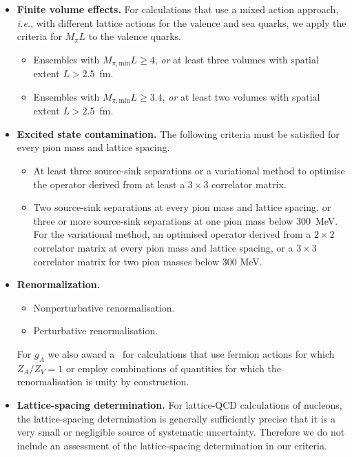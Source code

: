 \begin{itemize}
\item {\bfseries Finite volume effects.} 
%
For calculations that use a mixed action approach, {\it i.e.},
with different lattice actions for the valence and sea quarks, 
we apply the criteria for $M_\pi L$ to the valence quarks.
%
\begin{itemize}
%
\item[\bstar] Ensembles with $M_{\pi,\mathrm{min}}L\geq 4$, \emph{or} at least 
three volumes with spatial extent $L>2.5$~fm.
\item[\bcirc] Ensembles with $M_{\pi,\mathrm{min}}L \geq 3.4$, \emph{or} at least 
two volumes with spatial extent $L>2.5$~fm.
\end{itemize}

\item {\bfseries Excited state contamination.} 
The following criteria must be satisfied for every pion mass and lattice 
spacing.
%
\begin{itemize}
%
\item[\bstar] At least three source-sink separations or a variational method 
to optimise the operator derived from at least a $3\times 3$ correlator matrix.
% 
\item[\bcirc] Two source-sink separations at every pion mass and lattice 
spacing, or three or more source-sink separations at one pion mass below 
300~MeV. 
%
For the variational method, an optimised operator derived from a $2\times 2$ 
correlator matrix at every pion mass and lattice spacing, or a $3\times 3$ 
correlator matrix for two pion masses below 300 MeV.
%
\end{itemize}

\item {\bfseries Renormalization.} 
\begin{itemize}
%
\item[\bstar] Nonperturbative renormalisation.
%
\item[\bcirc] Perturbative renormalisation.
%
\end{itemize}
%
For $g_A$ we also award a \bstar~for calculations that use fermion actions 
for which $Z_A/Z_V=1$ or employ combinations of quantities for which the 
renormalisation is unity by construction.

\item {\bfseries Lattice-spacing determination.} 
For lattice-QCD calculations of nucleons, the lattice-spacing determination is 
generally sufficiently precise that it is a very small or negligible source
of systematic uncertainty. 
%
Therefore we do not include an assessment of the lattice-spacing
determination in our criteria.

\end{itemize}

